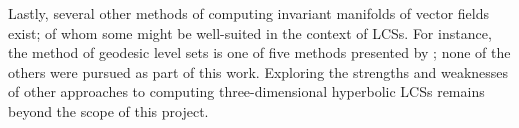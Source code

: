 Lastly, several other methods of computing invariant manifolds of vector fields
exist; of whom some might be well-suited in the context of LCSs. For instance,
the method of geodesic level sets is one of five methods presented by
\textcite{krauskopf2005survey}; none of the others were pursued as part of this
work. Exploring the strengths and weaknesses of other
approaches to computing three-dimensional hyperbolic LCSs remains beyond the
scope of this project.
